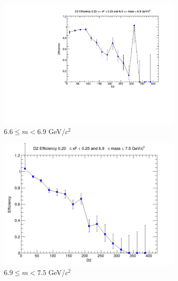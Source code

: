 \documentclass[11pt]{article}
\begin{document}
\begin{figure}[p]
\begin{subfigure}[b]{0.32\textwidth}
        \includegraphics[width=\textwidth]{./kTrackerEfficiencyPlots/D2_Efficiency_xF4_mass8.pdf}
        \caption{$6.6 \leq m < 6.9$ GeV/$c^2$}
    \end{subfigure}\vspace{0.5cm}
    \begin{subfigure}[b]{0.32\textwidth}
        \centering
        \includegraphics[width=\textwidth]{./kTrackerEfficiencyPlots/D2_Efficiency_xF4_mass9.png}
        \caption{$6.9 \leq m < 7.5$ GeV/$c^2$}
    \end{subfigure}\hfill
    \begin{subfigure}[b]{0.32\textwidth}
        \centering

\end{subfigure}
\end{figure}
\end{document}
